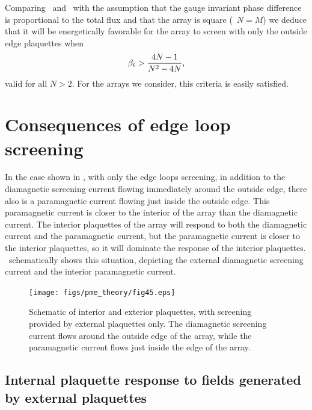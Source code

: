 Comparing \ and 
\ with the assumption
that the gauge invariant phase difference is 
proportional to the total flux and that the array is square (\ie\ $N=M$)
we deduce that it will be energetically
favorable for the array to screen with only the outside
edge plaquettes when
%
\begin{equation}
\beta_\ell > {4 N -1 \over N^2 - 4N}\mbox{,}
\end{equation}
%
valid for all $N>2$. For the arrays we consider, this 
criteria is easily satisfied. 

\section{Consequences of edge loop screening}

In the case shown in , 
with only the edge loops screening, 
in addition to the diamagnetic screening current flowing immediately
around the outside edge, there also is a paramagnetic
current flowing just inside the outside edge. This paramagnetic
current is closer to the interior of the array than the diamagnetic
current. The interior plaquettes of the array will respond to both
the diamagnetic current and the paramagnetic current, but the 
paramagnetic current is closer to the interior plaquettes, so 
it will dominate the response of the interior plaquettes. 
\  schematically shows this situation, 
depicting the external diamagnetic screening current and the interior
paramagnetic current.

\begin{figure}[p]
\texttt{[image: figs/pme\_theory/fig45.eps]}
\caption[Schematic of interior and exterior plaquettes, with screening
provided by external plaquettes only.]
{Schematic of interior and exterior plaquettes, with screening provided
by external plaquettes only. The diamagnetic screening current flows 
around the outside edge of the array, while the paramagnetic current
flows just inside the edge of the array.}
\label{fig:screening_schematic}
\end{figure}

\subsection{Internal plaquette response to fields generated by external
plaquettes}

